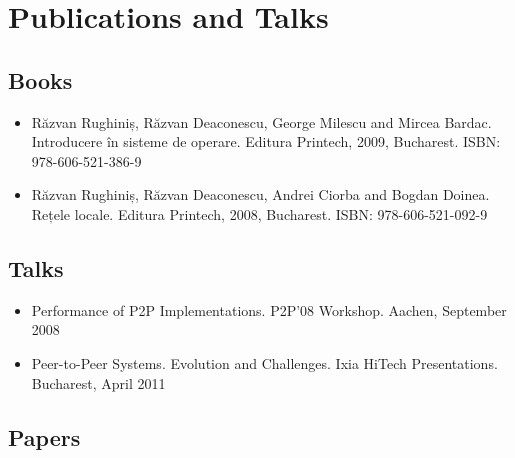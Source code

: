 
\section{Publications and Talks}
\label{sec:conclusion:publications}

\subsection{Books}

\begin{itemize}
  \item Răzvan Rughiniș, Răzvan Deaconescu, George Milescu and Mircea Bardac.
  Introducere în sisteme de operare. Editura Printech, 2009, Bucharest. ISBN:
  978-606-521-386-9
  \item Răzvan Rughiniș, Răzvan Deaconescu, Andrei Ciorba and Bogdan Doinea.
  Rețele locale. Editura Printech, 2008, Bucharest. ISBN: 978-606-521-092-9
\end{itemize}

\subsection{Talks}

\begin{itemize}
  \item Performance of P2P Implementations. P2P'08 Workshop. Aachen, September
  2008
  \item Peer-to-Peer Systems. Evolution and Challenges. Ixia HiTech
  Presentations. Bucharest, April 2011
\end{itemize}

\subsection{Papers}

